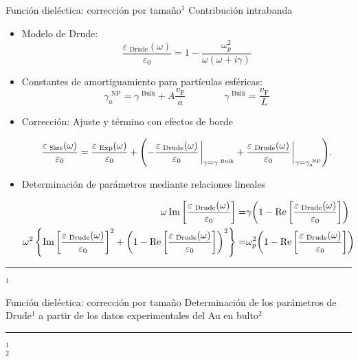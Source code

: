\begin{frame}{Función dieléctica: corrección por tamaño$^1$}
{Contribución intrabanda}\small
\begin{itemize}
\item Modelo de Drude:
$$\frac{\varepsilon_\text{ Drude}(\omega)}{\varepsilon_0} = 1 - \frac{\omega_p^2}{\omega(\omega + i \gamma)} $$
\item Constantes de amortiguamiento para partículas esféricas:
$$ 
\gamma^\text{   NP}_a =  \gamma^\text{  Bulk} + A\frac{v_\text{F}}{a}
\qquad\qquad
\gamma^\text{   Bulk} = \frac{v_\text{F}}{L}
$$
\item Corrección: Ajuste y término con efectos de borde

\begin{align*}
\frac{\varepsilon_\text{  Size}(\omega)}{\varepsilon_0} =
	\frac{\varepsilon_\text{  Exp}(\omega)}{\varepsilon_0} +
 \qty(-
	 \frac{\varepsilon_\text{  Drude}(\omega)}{\varepsilon_0}
	 									\eval_{\gamma = \gamma^\text{   Bulk}}
	 +
	 \frac{\varepsilon_\text{  Drude}(\omega)}{\varepsilon_0}
 										\eval_{\gamma = \gamma^\text{   NP}_a} 	).
\end{align*}
\item Determinación de parámetros mediante relaciones lineales

\begin{align*}
\omega \Im\qty[\frac{\varepsilon_\text{  Drude}(\omega)}{\varepsilon_0}] =&
 \gamma \qty(1 - \Re\qty[\frac{\varepsilon_\text{  Drude}(\omega)}{\varepsilon_0}])\\
\omega^2\left\{ \Im\qty[\frac{\varepsilon_\text{  Drude}(\omega)}{\varepsilon_0}]^2
			+ \qty(1-\Re\qty[\frac{\varepsilon_\text{  Drude}(\omega)}{\varepsilon_0}])^2 \right\}
 =& \omega_p^2 \qty(1 - \Re\qty[\frac{\varepsilon_\text{  Drude}(\omega)}{\varepsilon_0}])
\end{align*}
\end{itemize}
%
	\noindent\rule{.25\textwidth}{0.4pt}
 \begin{spacing}{0}\fontsize{4}{12} \selectfont
	$^1$ 
	\end{spacing}
\end{frame}

\begin{frame}{Función dieléctica: corrección por tamaño}
{Determinación de los parámetros de Drude$^1$ a partir de los datos experimentales del Au en bulto$^2$}\small
 \begin{figure} \centering
\def\svgwidth{.7\textwidth}
\end{figure}

	\noindent\rule{.25\textwidth}{0.4pt}
 \begin{spacing}{0}\fontsize{4}{12} \selectfont
	$^1$ \\
	$^2$ 
	\end{spacing}
\end{frame}

